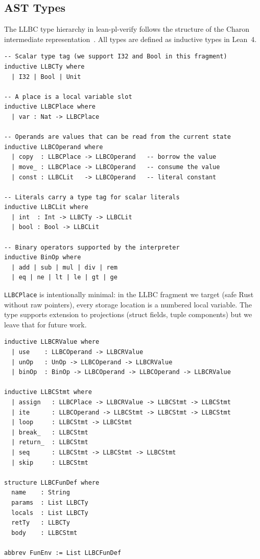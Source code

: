 \subsection{AST Types}
\label{sec:llbc-ast}

The LLBC type hierarchy in lean-pl-verify follows the structure of the Charon
intermediate representation~\cite{charon2024}. All types are defined as
inductive types in Lean~4.

\begin{lstlisting}[caption={LLBC type hierarchy.},label={lst:llbc-types}]
-- Scalar type tag (we support I32 and Bool in this fragment)
inductive LLBCTy where
  | I32 | Bool | Unit

-- A place is a local variable slot
inductive LLBCPlace where
  | var : Nat -> LLBCPlace

-- Operands are values that can be read from the current state
inductive LLBCOperand where
  | copy  : LLBCPlace -> LLBCOperand   -- borrow the value
  | move_ : LLBCPlace -> LLBCOperand   -- consume the value
  | const : LLBCLit   -> LLBCOperand   -- literal constant

-- Literals carry a type tag for scalar literals
inductive LLBCLit where
  | int  : Int -> LLBCTy -> LLBCLit
  | bool : Bool -> LLBCLit

-- Binary operators supported by the interpreter
inductive BinOp where
  | add | sub | mul | div | rem
  | eq | ne | lt | le | gt | ge
\end{lstlisting}

\texttt{LLBCPlace} is intentionally minimal: in the LLBC fragment we target
(safe Rust without raw pointers), every storage location is a numbered local
variable. The type supports extension to projections (\eg struct fields, tuple
components) but we leave that for future work.

\begin{lstlisting}[caption={LLBC rvalue and statement types.},label={lst:llbc-stmt}]
inductive LLBCRValue where
  | use    : LLBCOperand -> LLBCRValue
  | unOp   : UnOp -> LLBCOperand -> LLBCRValue
  | binOp  : BinOp -> LLBCOperand -> LLBCOperand -> LLBCRValue

inductive LLBCStmt where
  | assign   : LLBCPlace -> LLBCRValue -> LLBCStmt -> LLBCStmt
  | ite      : LLBCOperand -> LLBCStmt -> LLBCStmt -> LLBCStmt
  | loop     : LLBCStmt -> LLBCStmt
  | break_   : LLBCStmt
  | return_  : LLBCStmt
  | seq      : LLBCStmt -> LLBCStmt -> LLBCStmt
  | skip     : LLBCStmt

structure LLBCFunDef where
  name    : String
  params  : List LLBCTy
  locals  : List LLBCTy
  retTy   : LLBCTy
  body    : LLBCStmt

abbrev FunEnv := List LLBCFunDef
\end{lstlisting}


